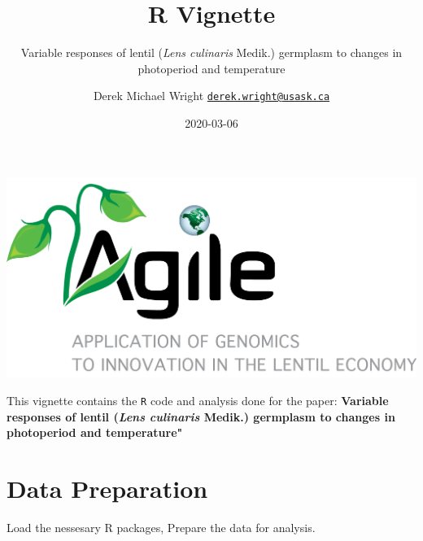 \documentclass[
]{article}
\title{R Vignette}
\subtitle{Variable responses of lentil (\emph{Lens culinaris} Medik.) germplasm to
changes in photoperiod and temperature}
\author{Derek Michael Wright
\href{mailto:derek.wright@usask.ca}{\nolinkurl{derek.wright@usask.ca}}}
\date{2020-03-06}
\begin{document}
\maketitle

{
\setcounter{tocdepth}{2}
\tableofcontents
}
\includegraphics{Additional/img_Agile.png}

This vignette contains the \texttt{R} code and analysis done for the
paper: \textbf{Variable responses of lentil (\emph{Lens culinaris}
Medik.) germplasm to changes in photoperiod and temperature"}

\hypertarget{data-preparation}{%
\section{Data Preparation}\label{data-preparation}}

Load the nessesary R packages, Prepare the data for analysis.
\end{document}
